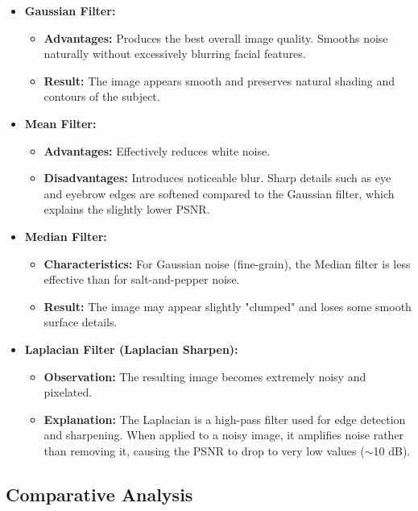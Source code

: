 \documentclass[a4paper,12pt]{article}
\begin{document}
\begin{itemize}
    \item \textbf{Gaussian Filter:}
    \begin{itemize}
        \item \textbf{Advantages:} Produces the best overall image quality. Smooths noise naturally without excessively blurring facial features.
        \item \textbf{Result:} The image appears smooth and preserves natural shading and contours of the subject.
    \end{itemize}

    \item \textbf{Mean Filter:}
    \begin{itemize}
        \item \textbf{Advantages:} Effectively reduces white noise.
        \item \textbf{Disadvantages:} Introduces noticeable blur. Sharp details such as eye and eyebrow edges are softened compared to the Gaussian filter, which explains the slightly lower PSNR.
    \end{itemize}

    \item \textbf{Median Filter:}
    \begin{itemize}
        \item \textbf{Characteristics:} For Gaussian noise (fine-grain), the Median filter is less effective than for salt-and-pepper noise.
        \item \textbf{Result:} The image may appear slightly "clumped" and loses some smooth surface details.
    \end{itemize}

    \item \textbf{Laplacian Filter (Laplacian Sharpen):}
    \begin{itemize}
        \item \textbf{Observation:} The resulting image becomes extremely noisy and pixelated.
        \item \textbf{Explanation:} The Laplacian is a high-pass filter used for edge detection and sharpening. When applied to a noisy image, it amplifies noise rather than removing it, causing the PSNR to drop to very low values ($\sim$10 dB).
    \end{itemize}
\end{itemize}
\subsection{Comparative Analysis}
\end{document}
